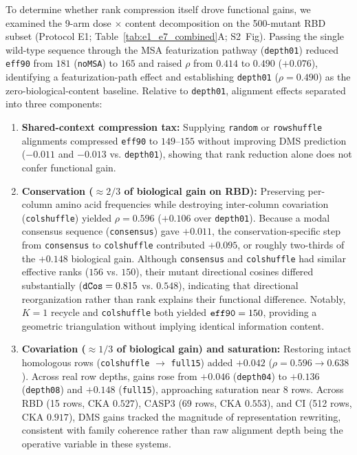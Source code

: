 \documentclass[10pt,a4paper]{article}
\begin{document}
To determine whether rank compression itself drove functional gains, we examined the 9-arm dose $\times$ content decomposition on the 500-mutant RBD subset (Protocol E1; Table~\ref{tab:e1_e7_combined}A; S2~Fig). Passing the single wild-type sequence through the MSA featurization pathway (\texttt{depth01}) reduced \texttt{eff90} from $181$ (\texttt{noMSA}) to $165$ and raised $\rho$ from $0.414$ to $0.490$ ($+0.076$), identifying a featurization-path effect and establishing \texttt{depth01} ($\rho = 0.490$) as the zero-biological-content baseline. Relative to \texttt{depth01}, alignment effects separated into three components:
\begin{enumerate}
    \setlength{\itemsep}{2pt}\setlength{\parskip}{0pt}
    \item \textbf{Shared-context compression tax:} Supplying \texttt{random} or \texttt{rowshuffle} alignments compressed \texttt{eff90} to $149$--$155$ without improving DMS prediction ($-0.011$ and $-0.013$ vs. \texttt{depth01}), showing that rank reduction alone does not confer functional gain.
    \item \textbf{Conservation ($\approx 2/3$ of biological gain on RBD):} Preserving per-column amino acid frequencies while destroying inter-column covariation (\texttt{colshuffle}) yielded $\rho = 0.596$ ($+0.106$ over \texttt{depth01}). Because a modal consensus sequence (\texttt{consensus}) gave $+0.011$, the conservation-specific step from \texttt{consensus} to \texttt{colshuffle} contributed $+0.095$, or roughly two-thirds of the $+0.148$ biological gain. Although \texttt{consensus} and \texttt{colshuffle} had similar effective ranks ($156$ vs. $150$), their mutant directional cosines differed substantially ($\text{\texttt{dCos}} = 0.815$ vs. $0.548$), indicating that directional reorganization rather than rank explains their functional difference. Notably, $K=1$ recycle and \texttt{colshuffle} both yielded $\text{\texttt{eff90}} = 150$, providing a geometric triangulation without implying identical information content.
    \item \textbf{Covariation ($\approx 1/3$ of biological gain) and saturation:} Restoring intact homologous rows (\texttt{colshuffle} $\rightarrow$ \texttt{full15}) added $+0.042$ ($\rho = 0.596 \rightarrow 0.638$). Across real row depths, gains rose from $+0.046$ (\texttt{depth04}) to $+0.136$ (\texttt{depth08}) and $+0.148$ (\texttt{full15}), approaching saturation near 8 rows. Across RBD (15 rows, CKA $0.527$), CASP3 (69 rows, CKA $0.553$), and CI (512 rows, CKA $0.917$), DMS gains tracked the magnitude of representation rewriting, consistent with family coherence rather than raw alignment depth being the operative variable in these systems.
\end{enumerate}
\end{document}
